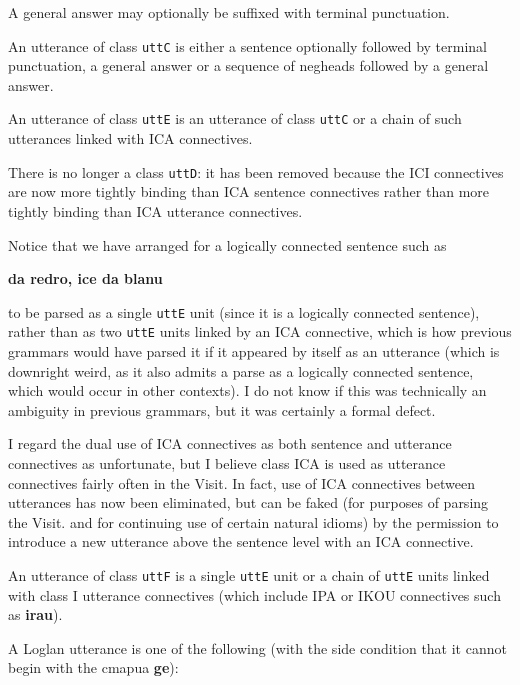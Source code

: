 \documentclass[12pt]{book}
\begin{document}
A general answer may optionally be suffixed with terminal punctuation.

An utterance of class {\tt uttC} is either a sentence optionally followed by terminal punctuation, a general answer or a sequence of negheads followed by a general answer.

An utterance of class {\tt uttE} is an utterance of class {\tt uttC} or a chain of such utterances linked with ICA connectives.

There is no longer a class {\tt uttD}:  it has been removed because the ICI connectives are now more tightly binding than ICA sentence connectives rather than more tightly binding than ICA utterance connectives.

Notice that we have arranged for a logically connected sentence such as

{\bf da redro, ice da blanu}

to be parsed as a single {\tt uttE} unit (since it is a logically connected sentence), rather than as two {\tt uttE} units linked by an ICA connective, which is how previous grammars would have parsed it if it appeared by itself as an utterance (which is downright weird, as it also admits a parse as a logically connected sentence, which would occur in other contexts).  I do not know if this was technically an ambiguity in previous grammars, but it was certainly a formal defect.

I regard the dual use of ICA connectives as both sentence and utterance connectives as unfortunate, but I believe class ICA is used as utterance connectives fairly often in the Visit.  In fact, use of ICA connectives between utterances has now been eliminated, but can be faked (for purposes of parsing the Visit. and for continuing use of certain natural idioms) by the permission to introduce a new utterance above the sentence level with an ICA connective.

An utterance of class {\tt uttF} is a single {\tt uttE} unit or a chain of {\tt uttE} units linked with class I utterance connectives (which include IPA or IKOU connectives such as {\bf irau}).

A Loglan utterance is one of the following (with the side condition that it cannot begin with the cmapua {\bf ge}):
\end{document}
